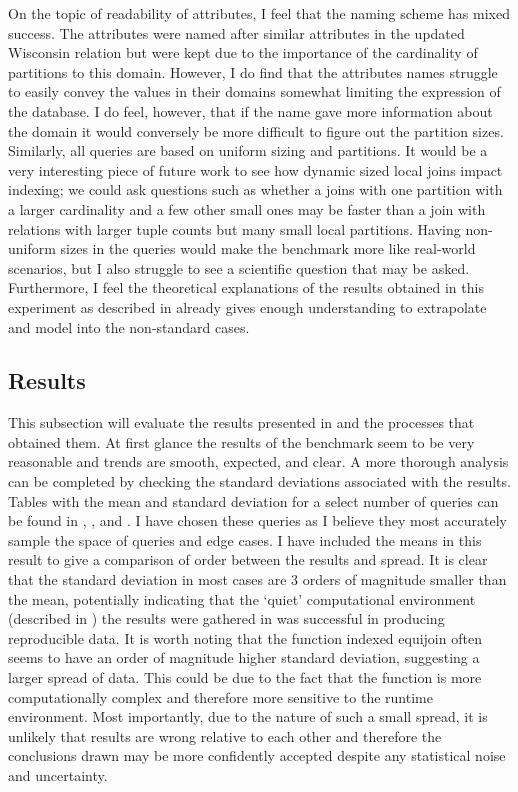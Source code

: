 On the topic of readability of attributes, I feel that the naming scheme has
mixed success. The attributes were named after similar attributes in the updated
Wisconsin relation but were kept due to the importance of the cardinality of
partitions to this domain. However, I do find that the attributes names struggle
to easily convey the values in their domains somewhat limiting the expression of
the database. I do feel, however, that if the name gave more information about
the domain it would conversely be more difficult to figure out the partition
sizes. Similarly, all queries are based on uniform sizing and partitions. It
would be a very interesting piece of future work to see how dynamic sized local
joins impact indexing; we could ask questions such as whether a joins with one
partition with a larger cardinality and a few other small ones may be faster than
a join with relations with larger tuple counts but many small local partitions.
Having non-uniform sizes in the queries would make the benchmark more like
real-world scenarios, but I also struggle to see a scientific question that
may be asked. Furthermore, I feel the theoretical explanations of the results
obtained in this experiment as described in 
already gives enough understanding to extrapolate and model into the
non-standard cases.

\subsection{Results}
This subsection will evaluate the results presented in
 and the processes that obtained them.
At first glance the results of the benchmark seem to be very reasonable and
trends are smooth, expected, and clear. A more thorough analysis can be completed
by checking the standard deviations associated with the results. Tables with the
mean and standard deviation for a select number of queries can be found in
,
, and
. I have
chosen these queries as I believe they most accurately sample the space of
queries and edge cases. I have included the means in this result to give a
comparison of order between the results and spread. It is clear that the
standard deviation in most cases are 3 orders of magnitude smaller than the
mean, potentially indicating that the `quiet' computational environment
(described in ) the
results were gathered in was successful in producing reproducible data. It is
worth noting that the function indexed equijoin often seems to have an
order of magnitude higher standard deviation, suggesting a larger spread of
data. This could be due to the fact that the function is more computationally
complex and therefore more sensitive to the runtime environment. Most importantly,
due to the nature of such a small spread, it is unlikely that results are wrong
relative to each other and therefore the conclusions drawn
may be more confidently accepted despite any statistical noise and uncertainty.

